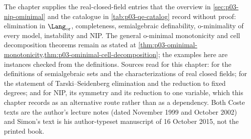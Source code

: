 The chapter supplies the real-closed-field entries that the overview in
\cref{sec:p03-nip-ominimal} and the catalogue in
\cref{tab:p03-qe-catalog} record without proof: elimination in
\(\Lang_{\mathrm{or}}\), completeness, semialgebraic definability,
o-minimality of every model, instability and NIP.  The general o-minimal
monotonicity and cell decomposition theorems remain as stated at
\cref{thm:p03-ominimal-monotonicity,thm:p03-ominimal-cell-decomposition};
the examples here are instances checked from the definitions.  Sources read
for this chapter: \cite[pp.~5--11]{Coste1999OMin} for the definitions of
semialgebraic sets and the characterizations of real closed fields;
\cite[pp.~11--12]{Coste2002SAG} for the statement of Tarski--Seidenberg
elimination and the reduction to fixed degrees; and
\cite[pp.~13--17]{Simon2015GuideManuscript} for NIP, its symmetry and its
reduction to one variable, which this chapter records as an alternative
route rather than as a dependency.  Both Coste texts are the author's lecture notes
(dated November 1999 and October 2002) and Simon's text is his author-typeset
manuscript of 16 October 2015, not the printed book.

